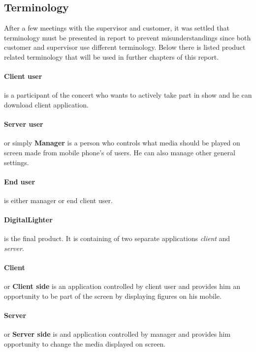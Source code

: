 \subsection {Terminology}
\label{sec:terminology}
After a few meetings with the supervisor and customer, it was settled that terminology must be presented in report to prevent misunderstandings since both customer and supervisor use different terminology.
Below there is listed product related terminology that will be used in further chapters of this report.

\paragraph{Client user}
is a participant of the concert who wants to actively take part in show and he can download client application.

\paragraph{Server user}
or simply \textbf{Manager} is a person who controls what media should be played on screen made from mobile phone's of users. 
He can also manage other general settings.

\paragraph{End user} is either manager or end client user.

\paragraph{DigitalLighter}
is the final product. It is containing of two separate applications \emph{client} and \emph{server}.

\paragraph{Client} or \textbf{Client side} is an application controlled by client user and provides him an opportunity to be part of the screen by displaying figures on his mobile.

\paragraph{Server} or \textbf{Server side} is and application controlled by manager and provides him opportunity to change the media displayed on screen.

